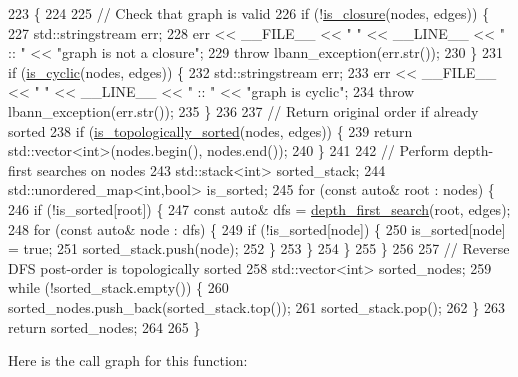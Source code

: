 \begin{DoxyCode}
223                                                                         \{
224 
225   \textcolor{comment}{// Check that graph is valid}
226   \textcolor{keywordflow}{if} (!\hyperlink{namespacelbann_1_1graph_ac9c1819b38f8bc514ab24ac8778f840b}{is\_closure}(nodes, edges)) \{
227     std::stringstream err;
228     err << \_\_FILE\_\_ << \textcolor{stringliteral}{" "} << \_\_LINE\_\_ << \textcolor{stringliteral}{" :: "} << \textcolor{stringliteral}{"graph is not a closure"};
229     \textcolor{keywordflow}{throw} lbann\_exception(err.str());
230   \}
231   \textcolor{keywordflow}{if} (\hyperlink{namespacelbann_1_1graph_a7cb66f3455c79ca9c959bcf2c36a92eb}{is\_cyclic}(nodes, edges)) \{
232     std::stringstream err;
233     err << \_\_FILE\_\_ << \textcolor{stringliteral}{" "} << \_\_LINE\_\_ << \textcolor{stringliteral}{" :: "} << \textcolor{stringliteral}{"graph is cyclic"};
234     \textcolor{keywordflow}{throw} lbann\_exception(err.str());
235   \}
236 
237   \textcolor{comment}{// Return original order if already sorted}
238   \textcolor{keywordflow}{if} (\hyperlink{namespacelbann_1_1graph_a0dd9dcef8bc13481677692347530e328}{is\_topologically\_sorted}(nodes, edges)) \{
239     \textcolor{keywordflow}{return} std::vector<int>(nodes.begin(), nodes.end());
240   \}
241 
242   \textcolor{comment}{// Perform depth-first searches on nodes}
243   std::stack<int> sorted\_stack;
244   std::unordered\_map<int,bool> is\_sorted;
245   \textcolor{keywordflow}{for} (\textcolor{keyword}{const} \textcolor{keyword}{auto}& root : nodes) \{
246     \textcolor{keywordflow}{if} (!is\_sorted[root]) \{
247       \textcolor{keyword}{const} \textcolor{keyword}{auto}& dfs = \hyperlink{namespacelbann_1_1graph_a44394207f3566604f867382b10aaf974}{depth\_first\_search}(root, edges);
248       \textcolor{keywordflow}{for} (\textcolor{keyword}{const} \textcolor{keyword}{auto}& node : dfs) \{
249         \textcolor{keywordflow}{if} (!is\_sorted[node]) \{
250           is\_sorted[node] = \textcolor{keyword}{true};
251           sorted\_stack.push(node);
252         \}
253       \}
254     \}
255   \}
256 
257   \textcolor{comment}{// Reverse DFS post-order is topologically sorted}
258   std::vector<int> sorted\_nodes;
259   \textcolor{keywordflow}{while} (!sorted\_stack.empty()) \{
260     sorted\_nodes.push\_back(sorted\_stack.top());
261     sorted\_stack.pop();
262   \}
263   \textcolor{keywordflow}{return} sorted\_nodes;
264   
265 \}
\end{DoxyCode}
Here is the call graph for this function\+:\nopagebreak
